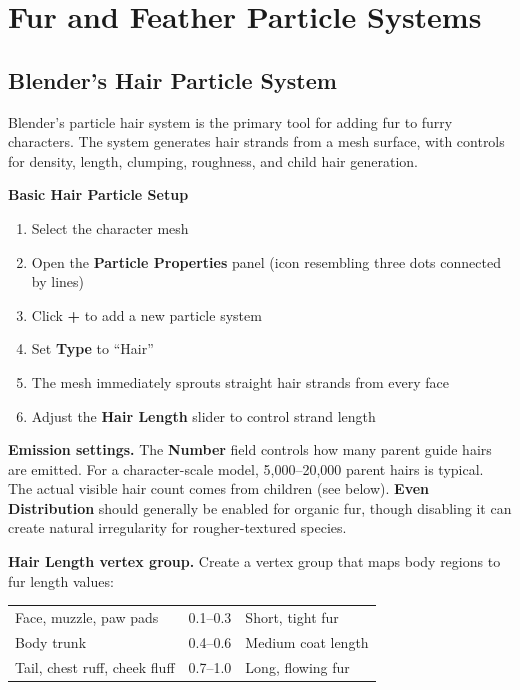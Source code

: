 \section{Fur and Feather Particle Systems}
\label{sec:furry-particles}

\subsection{Blender's Hair Particle System}

Blender's particle hair system is the primary tool for adding fur to furry characters. The system generates hair strands from a mesh surface, with controls for density, length, clumping, roughness, and child hair generation.

\begin{shortcutbox}
\textbf{Basic Hair Particle Setup}
\begin{enumerate}[leftmargin=2em]
  \item Select the character mesh
  \item Open the \textbf{Particle Properties} panel (icon resembling three dots connected by lines)
  \item Click \textbf{+} to add a new particle system
  \item Set \textbf{Type} to ``Hair''
  \item The mesh immediately sprouts straight hair strands from every face
  \item Adjust the \textbf{Hair Length} slider to control strand length
\end{enumerate}
\end{shortcutbox}

\textbf{Emission settings.} The \textbf{Number} field controls how many parent guide hairs are emitted. For a character-scale model, 5,000--20,000 parent hairs is typical. The actual visible hair count comes from children (see below). \textbf{Even Distribution} should generally be enabled for organic fur, though disabling it can create natural irregularity for rougher-textured species.

\textbf{Hair Length vertex group.} Create a vertex group that maps body regions to fur length values:

\begin{center}
\begin{tabularx}{\textwidth}{L{4cm}C{3cm}X}
\toprule
{}
 &  &  \\
\midrule
Face, muzzle, paw pads & 0.1--0.3 & Short, tight fur \\
Body trunk & 0.4--0.6 & Medium coat length \\
Tail, chest ruff, cheek fluff & 0.7--1.0 & Long, flowing fur \\
\bottomrule
\end{tabularx}
\end{center}

